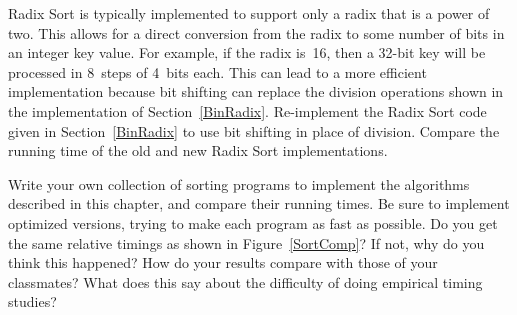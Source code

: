 \begin{projects}
\item
Radix Sort is typically implemented to support only a radix that is a
power of two.
This allows for a direct conversion from the radix to some number of
bits in an integer key value.
For example, if the radix is~16, then a 32-bit key will be processed
in 8~steps of 4~bits each.
This can lead to a more efficient implementation because bit shifting
can replace the division operations shown in the implementation of
Section~\ref{BinRadix}.
Re-implement the Radix Sort code given in Section~\ref{BinRadix} to use 
bit shifting in place of division.
Compare the running time of the old and new Radix Sort implementations.

\item
Write your own collection of sorting programs to implement the
algorithms described in this chapter,
and compare their running times.
Be sure to implement optimized versions, trying to
make each program as fast as possible.
Do you get the same relative timings as shown in
Figure~\ref{SortComp}?
If not, why do you think this happened?
How do your results compare with those of your classmates?
What does this say about the difficulty of doing empirical timing
studies?

\end{projects}
